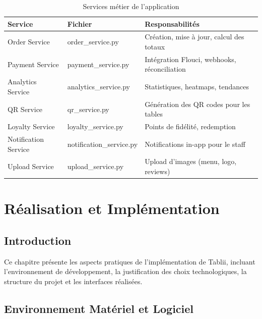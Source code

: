 \documentclass[12pt,a4paper]{report}
\begin{document}
\begin{table}[H]
    \centering
    \begin{tabularx}{\textwidth}{l l X}
        \toprule
        \rowcolor{accent!10}
        \textbf{Service} & \textbf{Fichier} & \textbf{Responsabilités} \\
        \midrule
        Order Service & order\_service.py & Création, mise à jour, calcul des totaux \\
        Payment Service & payment\_service.py & Intégration Flouci, webhooks, réconciliation \\
        Analytics Service & analytics\_service.py & Statistiques, heatmaps, tendances \\
        QR Service & qr\_service.py & Génération des QR codes pour les tables \\
        Loyalty Service & loyalty\_service.py & Points de fidélité, redemption \\
        Notification Service & notification\_service.py & Notifications in-app pour le staff \\
        Upload Service & upload\_service.py & Upload d'images (menu, logo, reviews) \\
        \bottomrule
    \end{tabularx}
    \caption{Services métier de l'application}
    \label{tab:services}
\end{table}

\cleardoublepage
\chapter{Réalisation et Implémentation}

\section{Introduction}

Ce chapitre présente les aspects pratiques de l'implémentation de Tablii, incluant l'environnement de développement, la justification des choix technologiques, la structure du projet et les interfaces réalisées.

\section{Environnement Matériel et Logiciel}
\end{document}

